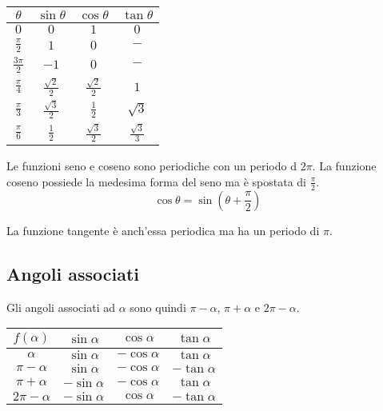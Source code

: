 \documentclass[a4paper]{article}
\begin{document}
\begin{center}
    \bgroup{}
    \def\arraystretch{1.25}
    \begin{tabular}{|c|c|c|c|}
        \hline
        \(\theta\) & \(\sin\theta\) & \(\cos\theta\) & \(\tan\theta\) \\
        \hline
        \(0\) & \(0\) & \(1\) & \(0\) \\
        \hline
        \(\frac{\pi}{2}\) & \(1\) & \(0\) & \(-\) \\
        \hline
        \(\frac{3\pi}{2}\) & \(-1\) & \(0\) & \(-\) \\
        \hline
        \(\frac{\pi}{4}\) & \(\frac{\sqrt{2}}{2}\) & \(\frac{\sqrt{2}}{2}\) & \(1\) \\
        \hline
        \(\frac{\pi}{3}\) & \(\frac{\sqrt{3}}{2}\) & \(\frac{1}{2}\) & \(\sqrt{3}\) \\
        \hline
        \(\frac{\pi}{6}\) & \(\frac{1}{2}\) & \(\frac{\sqrt{3}}{2}\) & \(\frac{\sqrt{3}}{3}\) \\
        \hline
    \end{tabular}
    \egroup{}
\end{center}

Le funzioni seno e coseno sono periodiche con un periodo d \(2\pi\).
La funzione coseno possiede la medesima forma del seno ma è spostata di \(\frac{\pi}{2}\).
\[
    \cos\theta = \sin\left(\theta + \frac{\pi}{2}\right)
\]

La funzione tangente è anch'essa periodica ma ha un periodo di \(\pi\).

\subsection{Angoli associati}

Gli angoli associati ad \(\alpha\) sono quindi \(\pi- \alpha\),
\(\pi + \alpha\) e \(2\pi-\alpha\).

\begin{center}
    \bgroup{}
    \def\arraystretch{1.25}
    \begin{tabular}{|c|c|c|c|}
        \hline
        \(f(\alpha)\) & \(\sin\alpha\) & \(\cos\alpha\) & \(\tan\alpha\) \\
        \hline
        \(\alpha\) & \(\sin\alpha\) & \(-\cos\alpha\) & \(\tan\alpha\) \\
        \hline
        \(\pi-\alpha\) & \(\sin\alpha\) & \(-\cos\alpha\) & \(-\tan\alpha\) \\
        \hline
        \(\pi +\alpha\) & \(-\sin\alpha\) & \(-\cos\alpha\) & \(\tan\alpha\) \\
        \hline
        \(2\pi - \alpha\) & \(-\sin\alpha\) & \(\cos\alpha\) & \(-\tan\alpha\) \\
        \hline
    \end{tabular}
    \egroup{}
\end{center}
\end{document}
